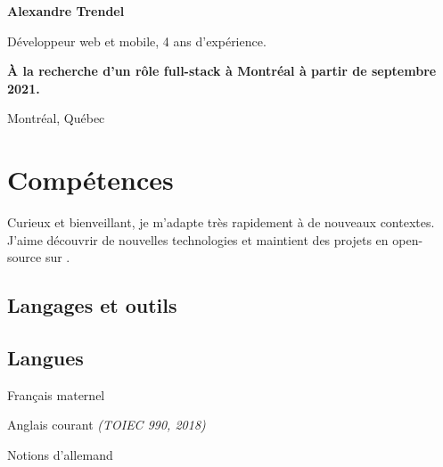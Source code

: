 \documentclass{cv}
\begin{document}
\pagestyle{empty}

\noindent\begin{minipage}[t]{0.5\textwidth}
	\noindent\textbf{\color{solviolet} \LARGE Alexandre Trendel}\medskip

	Développeur web et mobile, 4 ans d'expérience. \smallskip
	
	\textbf{À la recherche d'un rôle full-stack à Montréal à partir de septembre 2021.}	

	\smallskip\noindent{\color{solviolet}\rule{3cm}{1.5pt}}

\end{minipage}\hfill%
\begin{minipage}[t]{0.3\textwidth}
	 Montréal, Québec
	\newline{} %
	\newline{} \href{mailto:%
	}{\link{%
	}}%
	\newline{} \href{https://github.com/xou816}{} 
	
\end{minipage}


\section{Compétences}

Curieux et bienveillant, je m'adapte très rapidement à de nouveaux contextes. J'aime découvrir de nouvelles technologies et maintient des projets en open-source sur \href{https://github.com/xou816}{}.

\noindent%
\begin{minipage}[t]{0.40\textwidth}

	\subsection{Langages et outils}
	\begin{center}
		   
		  
		 
		  
	\end{center}

\end{minipage}\hfill%
\begin{minipage}[t]{0.45\textwidth}
	\subsection{Langues}
	Français maternel
	
	Anglais courant {\itshape (TOIEC 990, 2018)}
	
	Notions d'allemand
\end{minipage}
\end{document}
